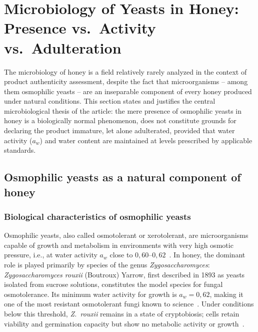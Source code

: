 
\section{Microbiology of Yeasts in Honey:
Presence vs.\ Activity vs.\ Adulteration}

The microbiology of honey is a field relatively rarely analyzed
in the context of product authenticity assessment, despite the fact
that microorganisms -- among them osmophilic yeasts -- are an
inseparable component of every honey produced under natural
conditions. This section states and justifies the central
microbiological thesis of the article: the mere presence of
osmophilic yeasts in honey is a biologically normal phenomenon,
does not constitute grounds for declaring the product immature,
let alone adulterated, provided that water activity ($a_w$) and
water content are maintained at levels prescribed by applicable
standards.

\subsection{Osmophilic yeasts as a natural component of honey}

\subsubsection{Biological characteristics of osmophilic yeasts}

Osmophilic yeasts, also called osmotolerant or xerotolerant, are
microorganisms capable of growth and metabolism in environments
with very high osmotic pressure, i.e., at water activity $a_w$
close to $0{,}60$--$0{,}62$~\cite{ruegg1981,waaw2006}. In honey,
the dominant role is played primarily by species of the genus
\textit{Zygosaccharomyces}:
\textit{Zygosaccharomyces rouxii} (Boutroux) Yarrow, first described
in 1893 as yeasts isolated from sucrose solutions, constitutes the
model species for fungal osmotolerance. Its minimum water activity
for growth is $a_w = 0{,}62$, making it one of the most resistant
osmotolerant fungi known to
science~\cite{waaw2006}. Under conditions below this threshold,
\textit{Z.~rouxii} remains in a state of cryptobiosis; cells
retain viability and germination capacity but show no metabolic
activity or growth~\cite{waaw2006,ruegg1981}.

